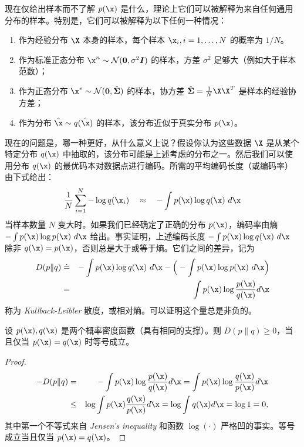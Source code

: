 \documentclass[../../book-main.tex]{subfiles}
\begin{document}
现在仅给出样本而不了解 $p(\x)$ 是什么，理论上它们可以被解释为来自任何通用分布的样本。特别是，它们可以被解释为以下任何一种情况：
\begin{enumerate}
    \item 作为经验分布 $\X$ 本身的样本，每个样本 $\x_i, i=1, \ldots, N$ 的概率为 $1/N$。
    \item 作为标准正态分布 $\x^n \sim \mathcal{N}(\boldsymbol{0}, \sigma^2 \boldsymbol{I})$ 的样本，方差 $\sigma^2$ 足够大（例如大于样本范数）；
    \item 作为正态分布 $\x^e \sim \mathcal{N}(\boldsymbol{0}, \hat{\boldsymbol{\Sigma}})$ 的样本，协方差 $\hat{ \boldsymbol{\Sigma}} = \frac{1}{N} \X \X^T$ 是样本的经验协方差；
    \item 作为分布 $\hat \x \sim q(\hat \x)$ 的样本，该分布近似于真实分布 $p(\x)$。
\end{enumerate}
现在的问题是，哪一种更好，从什么意义上说？假设你认为这些数据 $\X$ 是从某个特定分布 $q(\x)$ 中抽取的，该分布可能是上述考虑的分布之一。然后我们可以使用分布 $q(\x)$ 的最优码本对数据点进行编码。所需的平均编码长度（或编码率）由下式给出：
\begin{equation}
    \frac{1}{N}\sum_{i=1}^N -\log q(\x_i) \quad \approx \quad - \int p(\x) \log q(\x) ~d\x 
\end{equation}
当样本数量 $N$ 变大时。如果我们已经确定了正确的分布 $p(\x)$，编码率由熵 $- \int p(\x) \log p(\x) ~d\x$ 给出。事实证明，上述编码长度 $- \int p(\x) \log q(\x) ~d\x$ 除非 $q(\x) = p(\x)$，否则总是大于或等于熵。它们之间的差异，记为
\begin{eqnarray}
    D(p \| q) &\doteq& - \int p(\x) \log q(\x) ~d\x - \Big(- \int p(\x) \log p(\x) ~d\x \Big)\\
    &=& \int p(\x) \log \frac{p(\x)}{q(\x)} d\x 
\end{eqnarray}
称为 {\em Kullback-Leibler} 散度，或相对熵。可以证明这个量总是非负的。
\begin{theorem}[信息不等式]\label{thm:information-inequality}
设 $p(\x), q(\x)$ 是两个概率密度函数（具有相同的支撑）。则 $D(p \| q) \ge 0$，当且仅当 $p(\x) = q(\x)$ 时等号成立。
\end{theorem}
\begin{proof}
    \begin{eqnarray*}
    - D(p \| q) 
    &=& - \int p(\x) \log \frac{p(\x)}{q(\x)} d\x 
    =  \int p(\x) \log \frac{q(\x)}{p(\x)} d\x \\
    &\le& \log \int p(\x)  \frac{q(\x)}{p(\x)} d\x \label{eqn:jensen-KL} 
    = \log \int q(\x) d\x = \log 1 = 0,
    \end{eqnarray*}
其中第一个不等式来自 {\em Jensen's inequality} 和函数 $\log(\cdot)$ 严格凹的事实。等号成立当且仅当 $p(\x) = q(\x)$。
\end{proof}
\end{document}

